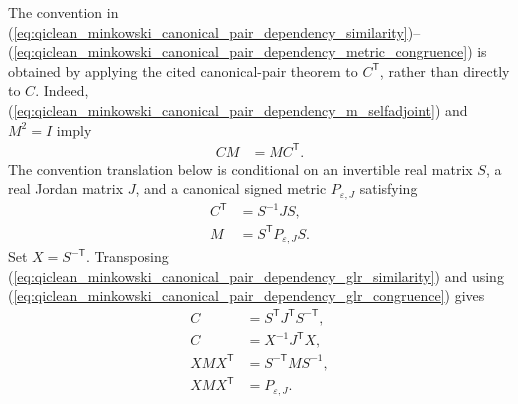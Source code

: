 \documentclass{article}
\begin{document}
The convention in
(\ref{eq:qiclean_minkowski_canonical_pair_dependency_similarity})--%
(\ref{eq:qiclean_minkowski_canonical_pair_dependency_metric_congruence})
is obtained by applying the cited canonical-pair theorem to
$C^{\mathsf T}$, rather than directly to $C$. Indeed,
(\ref{eq:qiclean_minkowski_canonical_pair_dependency_m_selfadjoint}) and
$M^2=I$ imply
\begin{align}
    CM
        &=MC^{\mathsf T}.
    \label{eq:qiclean_minkowski_canonical_pair_dependency_transpose_selfadjoint}
\end{align}
The convention translation below is conditional on an invertible real matrix
$S$, a real Jordan matrix $J$, and a canonical signed metric
$P_{\varepsilon,J}$ satisfying
\begin{align}
    C^{\mathsf T}
        &=S^{-1}JS,
    \label{eq:qiclean_minkowski_canonical_pair_dependency_glr_similarity}\\
    M
        &=S^{\mathsf T}P_{\varepsilon,J}S.
    \label{eq:qiclean_minkowski_canonical_pair_dependency_glr_congruence}
\end{align}
Set $X=S^{-\mathsf T}$. Transposing
(\ref{eq:qiclean_minkowski_canonical_pair_dependency_glr_similarity}) and
using
(\ref{eq:qiclean_minkowski_canonical_pair_dependency_glr_congruence}) gives
\begin{align}
    C
        &=S^{\mathsf T}J^{\mathsf T}S^{-\mathsf T},
    \label{eq:qiclean_minkowski_canonical_pair_dependency_transposed_similarity}\\
    C
        &=X^{-1}J^{\mathsf T}X,
    \label{eq:qiclean_minkowski_canonical_pair_dependency_x_similarity}\\
    XMX^{\mathsf T}
        &=S^{-\mathsf T}MS^{-1},
    \label{eq:qiclean_minkowski_canonical_pair_dependency_x_congruence_step}\\
    XMX^{\mathsf T}
        &=P_{\varepsilon,J}.
    \label{eq:qiclean_minkowski_canonical_pair_dependency_x_congruence}
\end{align}
\end{document}
